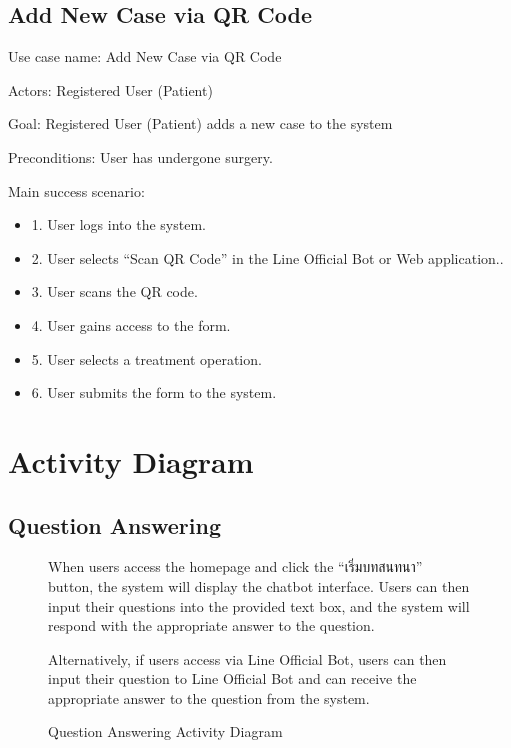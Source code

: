 \documentclass[12pt,oneside,openright,a4paper]{cpe-english-project}
\begin{document}
      \subsection{Add New Case via QR Code}
        \qquad Use case name: Add New Case via QR Code \par
        \qquad Actors: Registered User (Patient) \par
        \qquad Goal: Registered User (Patient) adds a new case to the system\par
        \qquad Preconditions: User has undergone surgery. \par
        \qquad Main success scenario:
        \begin{itemize}
          \item[] 1. User logs into the system.
          \item[] 2. User selects “Scan QR Code” in the Line Official Bot or Web application..
          \item[] 3. User scans the QR code.
          \item[] 4. User gains access to the form.
          \item[] 5. User selects a treatment operation.
          \item[] 6. User submits the form to the system.
        \end{itemize}

\newpage
    \section{Activity Diagram}
      \subsection{Question Answering}
      \begin{figure}[!h]
        \centering
        \caption{Question Answering Activity Diagram}\label{fig:AD_FAQ}
        \begin{flushleft}
          \qquad When users access the homepage and click the “\textthai{เริ่มบทสนทนา}” button, the system will display the chatbot interface. Users can then input their questions into the provided text box, and the system will respond with the appropriate answer to the question. \par
          \qquad Alternatively, if users access via Line Official Bot, users can then input their question to Line Official Bot and can receive the appropriate answer to the question from the system. \par
        \end{flushleft}
      \end{figure}
\end{document}
